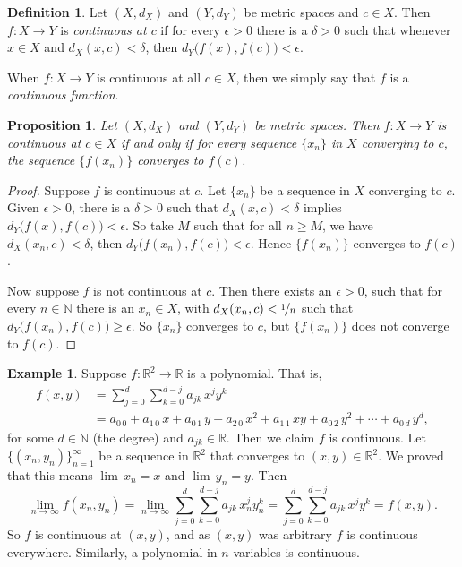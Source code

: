 \documentclass[12pt,openany]{book}
\newcommand{\R}{{\mathbb{R}}}
\newcommand{\N}{{\mathbb{N}}}
\theoremstyle{plain}
\newtheorem{prop}[thm]{Proposition}
\theoremstyle{remark}
\theoremstyle{definition}
\newtheorem{defn}[thm]{Definition}
\theoremstyle{exercise}
\theoremstyle{example}
\newtheorem{example}[thm]{Example}
\begin{document}
\begin{defn}
Let $(X,d_X)$ and $(Y,d_Y)$ be metric spaces and $c \in X$.
Then $f \colon X \to Y$ is
\emph{continuous at $c$}
if for every $\epsilon > 0$
there is a $\delta > 0$ such that whenever $x \in X$ and $d_X(x,c) <
\delta$, then
$d_Y\bigl(f(x),f(c)\bigr) < \epsilon$.

\medskip

When $f \colon X \to Y$ is continuous at all $c \in X$, then we simply say
that $f$ is a \emph{continuous function}.
\end{defn}

\begin{prop} \label{prop:contiscont}
Let $(X,d_X)$ and $(Y,d_Y)$ be metric spaces.
Then $f \colon X \to Y$ is
continuous at $c \in X$
if and only if for every sequence $\{ x_n \}$ in $X$
converging to $c$, the sequence $\{ f(x_n) \}$ converges
to $f(c)$.
\end{prop}

\begin{proof}
Suppose $f$ is continuous at $c$.  Let $\{ x_n \}$ be a
sequence in $X$ converging to $c$.  Given $\epsilon > 0$,
there is a $\delta > 0$ such that $d_X(x,c) < \delta$ implies
$d_Y\bigl(f(x),f(c)\bigr) < \epsilon$.  So take $M$ such that
for all $n \geq M$, we have $d_X(x_n,c) < \delta$, then
$d_Y\bigl(f(x_n),f(c)\bigr) < \epsilon$.  Hence $\{ f(x_n) \}$
converges to $f(c)$.

Now suppose $f$ is not continuous at $c$.
Then there exists an $\epsilon > 0$,
such that for every $n \in \N$ there is an $x_n \in X$,
with
$d_X(x_n,c) < \nicefrac{1}{n}$ such that $d_Y\bigl(f(x_n),f(c)\bigr) \geq
\epsilon$.  So $\{ x_n \}$ converges to $c$, but $\{ f(x_n) \}$
does not converge to $f(c)$.
\end{proof}

\begin{example}
Suppose $f \colon \R^2 \to \R$ is a polynomial.  That is,
\begin{equation*}
\begin{split}
f(x,y) & =
\sum_{j=0}^d
\sum_{k=0}^{d-j}
a_{jk}\,x^jy^k \\
& =
a_{0\,0} + a_{1\,0} \, x +
a_{0\,1} \, y+  
a_{2\,0} \, x^2+  
a_{1\,1} \, xy+  
a_{0\,2} \, y^2+ \cdots +
a_{0\,d} \, y^d ,
\end{split}
\end{equation*}
for some $d \in \N$ (the degree) and $a_{jk} \in \R$.  Then we claim 
$f$ is continuous.  Let $\{ (x_n,y_n) \}_{n=1}^\infty$ be a sequence
in $\R^2$ that converges to $(x,y) \in \R^2$.  We proved that this
means $\lim\, x_n = x$ and $\lim\, y_n = y$.  Then
\begin{equation*}
\lim_{n\to\infty}
f(x_n,y_n) =
\lim_{n\to\infty}
\sum_{j=0}^d
\sum_{k=0}^{d-j}
a_{jk} \, x_n^jy_n^k 
=
\sum_{j=0}^d
\sum_{k=0}^{d-j}
a_{jk} \, x^jy^k
=
f(x,y) .
\end{equation*}
So $f$ is continuous at $(x,y)$, and as $(x,y)$ was arbitrary $f$ is
continuous everywhere.  Similarly, a
polynomial in $n$ variables is continuous.
\end{example}
\end{document}
